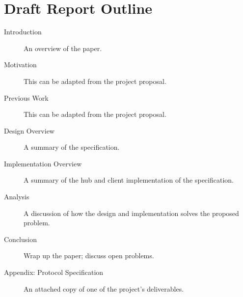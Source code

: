 \documentclass{article}
\begin{document}
\section*{Draft Report Outline}
\begin{description}
\item[Introduction] An overview of the paper.
\item[Motivation] This can be adapted from the project proposal.
\item[Previous Work] This can be adapted from the project proposal.
\item[Design Overview] A summary of the specification.
\item[Implementation Overview] A summary of the hub and client implementation of the specification.
\item[Analysis] A discussion of how the design and implementation solves the proposed problem.
\item[Conclusion] Wrap up the paper; discuss open problems.
\item[Appendix: Protocol Specification] An attached copy of one of the project's deliverables.
\end{description}

\nocite{dc-protocol}
\nocite{tor-ctl}
\nocite{tor-design}



\end{document}

